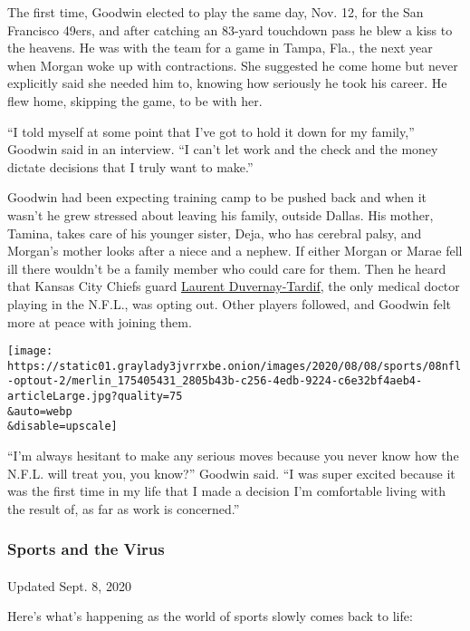 The first time, Goodwin elected to play the same day, Nov. 12, for the
San Francisco 49ers, and after catching an 83-yard touchdown pass he
blew a kiss to the heavens. He was with the team for a game in Tampa,
Fla., the next year when Morgan woke up with contractions. She suggested
he come home but never explicitly said she needed him to, knowing how
seriously he took his career. He flew home, skipping the game, to be
with her.

``I told myself at some point that I've got to hold it down for my
family,'' Goodwin said in an interview. ``I can't let work and the check
and the money dictate decisions that I truly want to make.''

Goodwin had been expecting training camp to be pushed back and when it
wasn't he grew stressed about leaving his family, outside Dallas. His
mother, Tamina, takes care of his younger sister, Deja, who has cerebral
palsy, and Morgan's mother looks after a niece and a nephew. If either
Morgan or Marae fell ill there wouldn't be a family member who could
care for them. Then he heard that Kansas City Chiefs guard
\href{https://www.nytimes3xbfgragh.onion/2018/05/30/sports/laurent-duvernay-tardif-nfl-doctor-chiefs.html}{Laurent
Duvernay-Tardif}, the only medical doctor playing in the N.F.L., was
opting out. Other players followed, and Goodwin felt more at peace with
joining them.

\texttt{[image: https://static01.graylady3jvrrxbe.onion/images/2020/08/08/sports/08nfl-optout-2/merlin\_175405431\_2805b43b-c256-4edb-9224-c6e32bf4aeb4-articleLarge.jpg?quality=75\\\&auto=webp\\\&disable=upscale]}

``I'm always hesitant to make any serious moves because you never know
how the N.F.L. will treat you, you know?'' Goodwin said. ``I was super
excited because it was the first time in my life that I made a decision
I'm comfortable living with the result of, as far as work is
concerned.''

\hypertarget{sports-and-the-virus}{%
\subsubsection{Sports and the Virus}\label{sports-and-the-virus}}

\paragraph{}

Updated Sept. 8, 2020

Here's what's happening as the world of sports slowly comes back to
life:

